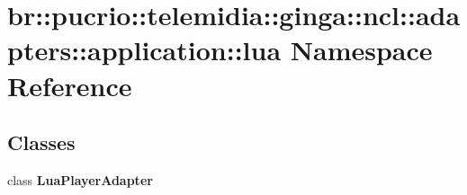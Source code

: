 \section{br::pucrio::telemidia::ginga::ncl::adapters::application::lua Namespace Reference}
\label{namespacebr_1_1pucrio_1_1telemidia_1_1ginga_1_1ncl_1_1adapters_1_1application_1_1lua}


\subsection*{Classes}
\begin{CompactItemize}
\item 
class {\bf LuaPlayerAdapter}
\end{CompactItemize}
